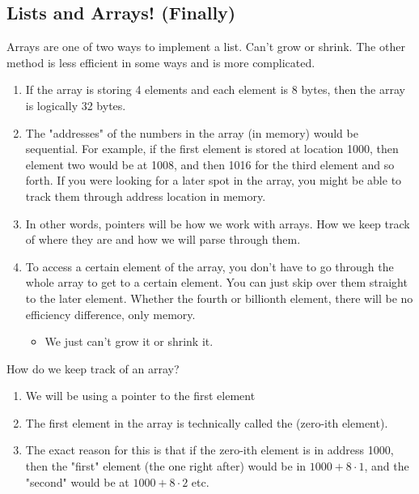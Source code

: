 \documentclass[12pt]{article}
\theoremstyle{definition}
\begin{document}
\subsection{Lists and Arrays! (Finally)}

\note Arrays are one of two ways to implement a list. Can't grow or shrink. The other method is less efficient in some ways and is more complicated. 

\begin{enumerate}
    \item If the array is storing 4 elements and each element is 8 bytes, then the array is logically 32 bytes. 
    \item The "addresses" of the numbers in the array (in memory) would be sequential. For example, if the first element is stored at location 1000, then element two would be at 1008, and then 1016 for the third element and so forth. If you were looking for a later spot in the array, you might be able to track them through address location in memory. 
    \item In other words, pointers will be how we work with arrays. How we keep track of where they are and how we will parse through them. 
    \item To access a certain element of the array, you don't have to go through the whole array to get to a certain element. You can just skip over them straight to the later element. Whether the fourth or billionth element, there will be no efficiency difference, only memory. 
    \begin{itemize}
        \item We just can't grow it or shrink it. 
    \end{itemize}

    
\end{enumerate}

How do we keep track of an array?
\begin{enumerate}
    \item We will be using a pointer to the first element
    \item The first element in the array is technically called the (zero-ith element). 
    \item The exact reason for this is that if the zero-ith element is in address 1000, then the "first" element (the one right after) would be in $1000 + 8\cdot1$, and the "second" would be at $1000 + 8\cdot2$ etc. 

\end{enumerate}
\end{document}
